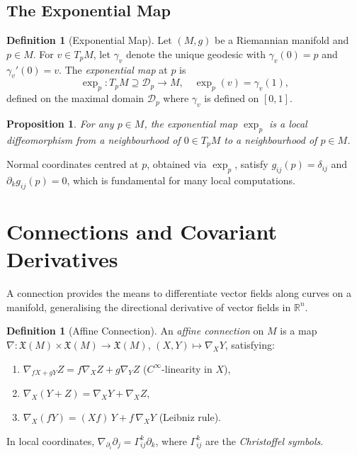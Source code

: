 \documentclass[12pt,a4paper]{amsart}
\newtheorem{proposition}[theorem]{Proposition}
\theoremstyle{definition}
\newtheorem{definition}[theorem]{Definition}
\begin{document}
\subsection{The Exponential Map}

\begin{definition}[Exponential Map]
Let $(M, g)$ be a Riemannian manifold and $p \in M$. For $v \in T_pM$,
let $\gamma_v$ denote the unique geodesic with $\gamma_v(0) = p$ and
$\gamma_v'(0) = v$. The \emph{exponential map} at $p$ is
\[
  \exp_p: T_pM \supseteq \mathcal{D}_p \to M, \quad
  \exp_p(v) = \gamma_v(1),
\]
defined on the maximal domain $\mathcal{D}_p$ where $\gamma_v$ is defined
on $[0,1]$.
\end{definition}

\begin{proposition}
For any $p \in M$, the exponential map $\exp_p$ is a local diffeomorphism
from a neighbourhood of $0 \in T_pM$ to a neighbourhood of $p \in M$.
\end{proposition}

Normal coordinates centred at $p$, obtained via $\exp_p$, satisfy
$g_{ij}(p) = \delta_{ij}$ and $\partial_k g_{ij}(p) = 0$, which is
fundamental for many local computations.

\section{Connections and Covariant Derivatives}
\label{sec:connections}

A connection provides the means to differentiate vector fields along curves
on a manifold, generalising the directional derivative of vector fields
in $\mathbb{R}^n$.

\begin{definition}[Affine Connection]
An \emph{affine connection} on $M$ is a map
$\nabla: \mathfrak{X}(M) \times \mathfrak{X}(M) \to \mathfrak{X}(M)$,
$(X, Y) \mapsto \nabla_X Y$, satisfying:
\begin{enumerate}[label=(\roman*)]
  \item $\nabla_{fX+gY} Z = f \nabla_X Z + g \nabla_Y Z$ \quad ($C^\infty$-linearity in $X$),
  \item $\nabla_X(Y + Z) = \nabla_X Y + \nabla_X Z$,
  \item $\nabla_X(fY) = (Xf)\,Y + f\,\nabla_X Y$ (Leibniz rule).
\end{enumerate}
In local coordinates, $\nabla_{\partial_i} \partial_j = \Gamma^k_{ij} \partial_k$,
where $\Gamma^k_{ij}$ are the \emph{Christoffel symbols}.
\end{definition}
\end{document}
